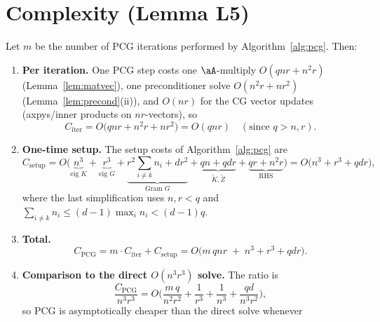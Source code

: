 \section*{Complexity (Lemma L5)}

\begin{lemma}
\label{lem:complexity}
Let $m$ be the number of PCG iterations performed by
Algorithm~\ref{alg:pcg}. Then:
\begin{enumerate}[label=\textup{(\roman*)}]
\item \textbf{Per iteration.} One PCG step costs one $\aA$-multiply
      $O(qnr+n^{2}r)$ (Lemma~\ref{lem:matvec}), one preconditioner solve
      $O(n^{2}r+nr^{2})$ (Lemma~\ref{lem:precond}(ii)), and $O(nr)$ for the CG
      vector updates (axpys/inner products on $nr$-vectors), so
      \begin{equation}\label{eq:periter}
        C_{\mathrm{iter}}=O\!\big(qnr+n^{2}r+nr^{2}\big)=O(qnr)\quad(\text{since }q>n,r).
      \end{equation}
\item \textbf{One-time setup.} The setup costs of Algorithm~\ref{alg:pcg} are
      \begin{equation}\label{eq:onetime}
        C_{\mathrm{setup}}
        = O\!\big(\underbrace{n^{3}}_{\text{eig }K}
        +\underbrace{r^{3}}_{\text{eig }G}
        +\underbrace{r^{2}\textstyle\sum_{i\neq k}n_i+dr^{2}}_{\text{Gram }G}
        +\underbrace{qn+qdr}_{\tilde K,\tilde Z}
        +\underbrace{qr+n^{2}r}_{\text{RHS}}\big)
        = O\!\big(n^{3}+r^{3}+qdr\big),
      \end{equation}
      where the last simplification uses $n,r<q$ and
      $\sum_{i\neq k}n_i\le (d-1)\max_i n_i< (d-1)q$.
\item \textbf{Total.}
      \begin{equation}\label{eq:total}
        C_{\mathrm{PCG}}
        = m\cdot C_{\mathrm{iter}}+C_{\mathrm{setup}}
        = O\!\big(m\,qnr\;+\;n^{3}+r^{3}+qdr\big).
      \end{equation}
\item \textbf{Comparison to the direct $O(n^{3}r^{3})$ solve.} The ratio is
      \begin{equation}\label{eq:ratio}
        \frac{C_{\mathrm{PCG}}}{n^{3}r^{3}}
        = O\!\Big(\frac{m\,q}{n^{2}r^{2}}+\frac1{r^{3}}+\frac1{n^{3}}
        +\frac{q d}{n^{3}r^{2}}\Big),
      \end{equation}
      so PCG is asymptotically cheaper than the direct solve whenever

\end{enumerate}
\end{lemma}
